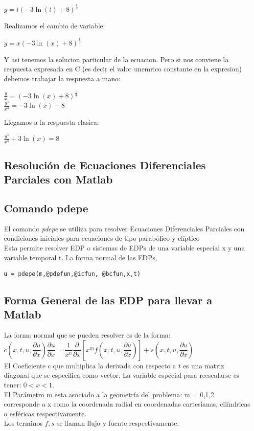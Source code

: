 \documentclass[10pt,a4paper]{article}
\begin{document}
\begin{center}
$y=t{(-3\ln(t)+8)}^{\frac{1}{3}}$
\end{center}

Realizamos el cambio de variable:

\begin{center}
$y=x{(-3\ln(x)+8)}^{\frac{1}{3}}$
\end{center}

Y asi tenemos la solucion particular de la ecuacion. Pero si nos conviene la respuesta expresada en C (es decir el valor unemrico constante en la expresion) debemos trabajar la respuesta a mano:

\begin{center}
$\frac{y}{x}={(-3\ln(x)+8)}^{\frac{1}{3}}$
\\
$\frac{y^3}{x^3}=-3\ln(x)+8$
\end{center}

Llegamos a la respuesta clasica:

\begin{center}
$\frac{y^3}{x^3}+3\ln(x)=8$
\end{center}
\begin{center}
\section{Resolución de Ecuaciones Diferenciales Parciales con Matlab}
\end{center}
\subsection{Comando pdepe} 
El comando \textit{pdepe} se utiliza para resolver 	Ecuaciones Diferenciales Parciales con condiciones iniciales para ecuaciones de tipo parabólico y elíptico\\
Esta permite resolver EDP o sistemas de EDPs de una variable especial x y una variable temporal t. La forma normal de las EDPs, 
\begin{verbatim}
u = pdepe(m,@pdefun,@icfun, @bcfun,x,t)
\end{verbatim}
\subsection{Forma General de las EDP para llevar a Matlab} 
La forma normal que se pueden resolver es de la forma:\\
$c (x,t,u, \dfrac{\partial u}{\partial x}) \dfrac{\partial u}{\partial x} = \dfrac{1}{x^n} \dfrac{\partial}{\partial x} [x^m f(x,t,u,\dfrac{\partial u}{\partial x})] + s(x,t,u, \dfrac{\partial u}{\partial x})$\\
El Coeficiente c que multiplica la derivada con respecto a $t$ es una matriz diagonal que se especifica como vector. La variable especial para 	reescalarse es tener: $0 < x < 1$.\\
El Parámetro m esta asociado a la geometría del problema: m = 0,1,2 corresponde a x como la coordenada radial en coordenadas cartesianas, cilíndricas o esféricas respectivamente. \\
Los terminos $f,s$ se llaman flujo y fuente respectivamente.
\end{document}
